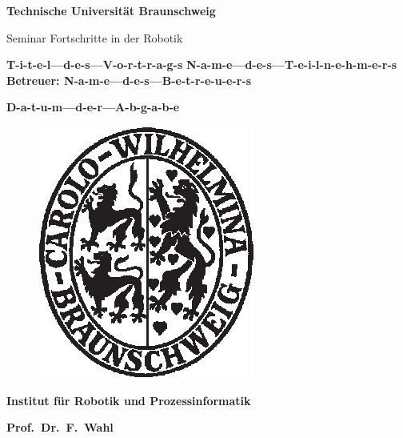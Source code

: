 \documentclass[german, 10pt]{report}
\begin{document}
\large {}
\begin{titlepage}
    \setcounter{page}{1}
    \let\footnotesize\small
    \let\footnoterule\relax
    \headsep 1.5cm
    \vskip -4cm
    \centerline{\Huge\bf Technische Universit\"{a}t Braunschweig}
    \vskip 3.4cm
    \begin{center}
        \begin{minipage}[t][7cm][c]{13.5cm}
            \begin{center}
                {\large{Seminar \glqq Fortschritte in der Robotik\grqq\\}\par}
                \vskip 0.5cm
                {\LARGE\bf {T-i-t-e-l---d-e-s---V-o-r-t-r-a-g-s}}
                \vskip 0.5cm
                {\Large\bf N-a-m-e---d-e-s---T-e-i-l-n-e-h-m-e-r-s}
                \vskip 0.25cm
                {\large\bf Betreuer: N-a-m-e---d-e-s---B-e-t-r-e-u-e-r-s}
                \vskip 0.75cm
                {\large\bf{D-a-t-u-m---d-e-r---A-b-g-a-b-e}\par}
            \end{center}
        \end{minipage}
    \end{center}
    \vskip 2.0cm
    \begin{figure}[h]
        \begin{center}
            \includegraphics{TU-Logo.eps}
        \end{center}
    \end{figure}
    \vskip 1cm
    \centerline{\LARGE\bf Institut f\"{u}r Robotik und Prozessinformatik}
    \vskip 1cm
    \centerline{\LARGE\bf Prof.~Dr.~F.~Wahl}




\end{titlepage}
\setcounter{footnote}{0}
\setcounter{totalnumber}{8}
\end{document}
